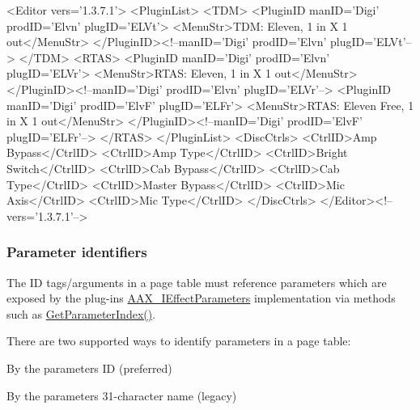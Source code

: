 \begin{DoxyCode}
<Editor vers=\textcolor{stringliteral}{'1.3.7.1'}>
    <PluginList>
        <TDM>
            <PluginID manID=\textcolor{stringliteral}{'Digi'} prodID=\textcolor{stringliteral}{'Elvn'} plugID=\textcolor{stringliteral}{'ELVt'}>
                <MenuStr>TDM:   Eleven, 1 in X 1 out</MenuStr>
            </PluginID><!--manID=\textcolor{stringliteral}{'Digi'} prodID=\textcolor{stringliteral}{'Elvn'} plugID=\textcolor{stringliteral}{'ELVt'}-->
        </TDM>
        <RTAS>
            <PluginID manID=\textcolor{stringliteral}{'Digi'} prodID=\textcolor{stringliteral}{'Elvn'} plugID=\textcolor{stringliteral}{'ELVr'}>
                <MenuStr>RTAS: Eleven, 1 in X 1 out</MenuStr>
            </PluginID><!--manID=\textcolor{stringliteral}{'Digi'} prodID=\textcolor{stringliteral}{'Elvn'} plugID=\textcolor{stringliteral}{'ELVr'}-->
            <PluginID manID=\textcolor{stringliteral}{'Digi'} prodID=\textcolor{stringliteral}{'ElvF'} plugID=\textcolor{stringliteral}{'ELFr'}>
                <MenuStr>RTAS: Eleven Free, 1 in X 1 out</MenuStr>
            </PluginID><!--manID=\textcolor{stringliteral}{'Digi'} prodID=\textcolor{stringliteral}{'ElvF'} plugID=\textcolor{stringliteral}{'ELFr'}-->
        </RTAS>
    </PluginList>
    <DiscCtrls>
        <CtrlID>Amp Bypass</CtrlID>
        <CtrlID>Amp Type</CtrlID>
        <CtrlID>Bright Switch</CtrlID>
        <CtrlID>Cab Bypass</CtrlID>
        <CtrlID>Cab Type</CtrlID>
        <CtrlID>Master Bypass</CtrlID>
        <CtrlID>Mic Axis</CtrlID>
        <CtrlID>Mic Type</CtrlID>
    </DiscCtrls>
</Editor><!--vers=\textcolor{stringliteral}{'1.3.7.1'}-->
\end{DoxyCode}


\hypertarget{a00363_subsection_parameter_identifiers}{}\subsubsection{Parameter identifiers}\label{a00363_subsection_parameter_identifiers}
 The {\ttfamily I\+D} tags/arguments in a page table must reference parameters which are exposed by the plug-\/in\textquotesingle{}s \hyperlink{a00099}{A\+A\+X\+\_\+\+I\+Effect\+Parameters} implementation via methods such as \hyperlink{a00061_aff1ff6b27973200429f057dc003f30a8}{Get\+Parameter\+Index()}.

There are two supported ways to identify parameters in a page table\+:
\begin{DoxyItemize}
\item By the parameter\textquotesingle{}s I\+D (preferred)
\item By the parameter\textquotesingle{}s 31-\/character name (legacy)
\end{DoxyItemize}

